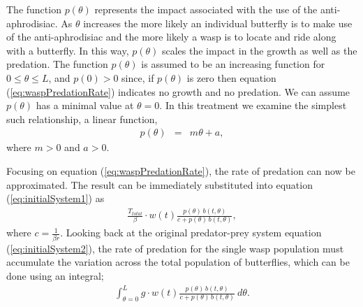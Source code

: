 \documentclass[review,authoryear]{elsarticle}
\newcommand{\origB}{{b}}
\newcommand{\origW}{{w}}
\newcommand{\origG}{{g}}
\newcommand{\origL}{{L}}
\newcommand{\origP}[1]{{p}(#1)}
\newcommand{\origTheta}{{\theta}}
\newcommand{\origT}{{t}}
\newcommand{\origM}{m}
\begin{document}
The function $\origP{\origTheta}$ represents the impact associated with the use
of the anti-aphrodisiac. As $\origTheta$ increases the more likely an
individual butterfly is to make use of the anti-aphrodisiac and the more
likely a wasp is to locate and ride along with a butterfly. In this way,
 $\origP{\origTheta}$ scales the impact in the growth as well as the predation.  
The function $\origP{\origTheta}$ is assumed to be an
increasing function for $0\leq\origTheta\leq \origL$, and $\origP{0}>0$ since, if
$\origP{\origTheta}$ is zero then equation (\ref{eq:waspPredationRate}) 
indicates no growth and no predation. We can assume $\origP{\origTheta}$ has a
minimal value at $\origTheta = 0$. In this treatment we
examine the simplest such relationship, a linear function,
\begin{eqnarray}
  \label{eq:firstDefP}
  \origP{\origTheta} & = & \origM \theta + a,
\end{eqnarray}
where $m>0$ and $a>0$.

Focusing on equation (\ref{eq:waspPredationRate}), the rate of
predation can now be approximated.  The result can be immediately
substituted into equation (\ref{eq:initialSystem1}) as
\begin{eqnarray}
  \label{eq:butterflyPredationRate}
  \frac{T_{total}}{\beta} \cdot w(\origT) \frac{p(\origTheta) \, \origB(\origT,\origTheta) }{c +  p(\origTheta) \, \origB(\origT,\origTheta)},
\end{eqnarray}
where $c=\frac{1}{\beta r}$.
Looking back at the
original predator-prey system  equation
(\ref{eq:initialSystem2}), the rate of predation for the single wasp
population must accumulate the variation across the total population of butterflies, which can be done using an integral; 
\begin{eqnarray}
  \label{eq:totalWaspPredationRate}
  \int^{\origL}_{\origTheta=0} \origG \cdot \origW(\origT) \frac{p(\origTheta)\, \origB(\origT,\origTheta) }{c + p(\origTheta) \, \origB(\origT,\origTheta)} ~ d\origTheta.
\end{eqnarray}
\end{document}

